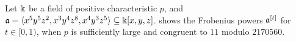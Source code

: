 \documentclass{amsart}
\begin{document}
\begin{example}
   \label{ex: ft.6}
   Let $\Bbbk$ be a field of positive characteristic $p$, and $\mathfrak{a} = \langle x^5 y^5 z^2, x^3 y^4 z^8, x^4 y^3 z^5 \rangle \subseteq \Bbbk[x,y,z]$.
    shows the Frobenius powers $\mathfrak{a}^{[t]}$ for $t \in [0,1)$, when $p$ is sufficiently large and congruent to $11$ modulo $\num{2170560}$.
\begin{table}
   \begin{center} 
      \begingroup
      \setlength{\tabcolsep}{8pt} %
      \renewcommand{\arraystretch}{1.4} %

\end{center}
\end{table}
\end{example}
\end{document}
